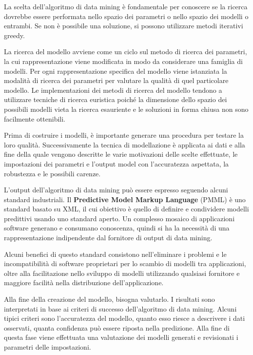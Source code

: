 \documentclass[a4paper]{extarticle}
\begin{document}
La scelta dell'algoritmo di data mining è fondamentale per conoscere se la ricerca dovrebbe essere performata nello spazio dei parametri o nello spazio dei modelli o entrambi. Se non è possibile una soluzione, si possono utilizzare metodi iterativi greedy. 

La ricerca del modello avviene come un ciclo sul metodo di ricerca dei parametri, la cui rappresentazione viene modificata in modo da considerare una famiglia di modelli. Per ogni rappresentazione specifica del modello viene istanziata la modalità di ricerca dei parametri per valutare la qualità di quel particolare modello. Le implementazioni dei metodi di ricerca del modello tendono a utilizzare tecniche di ricerca euristica poiché la dimensione dello spazio dei possibili modelli vieta la ricerca esauriente e le soluzioni in forma chiusa non sono facilmente ottenibili.

Prima di costruire i modelli, è importante generare una procedura per testare la loro qualità. Successivamente la tecnica di modellazione è applicata ai dati e alla fine della quale vengono descritte le varie motivazioni delle scelte effettuate, le impostazioni dei parametri e l'output model con l'accuratezza aspettata, la robustezza e le possibili carenze.

L'output dell'algoritmo di data mining può essere espresso seguendo alcuni standard industriali. Il \textbf{Predictive Model Markup Language} (PMML) è uno standard basato su XML, il cui obiettivo è quello di definire e condividere modelli predittivi usando uno standard aperto. Un complesso mosaico di applicazioni software generano e consumano conoscenza, quindi si ha la necessità di una rappresentazione indipendente dal fornitore di output di data mining. 

Alcuni benefici di questo standard consistono nell'eliminare i problemi e le incompatibilità di software proprietari per lo scambio di modelli tra applicazioni,  oltre alla facilitazione nello sviluppo di modelli utilizzando qualsiasi fornitore e maggiore facilità nella  distribuzione dell'applicazione.

Alla fine della creazione del modello, bisogna valutarlo. I risultati sono interpretati in base ai criteri di successo dell'algoritmo di data mining. Alcuni tipici criteri sono l'accuratezza del modello, quanto esso riesce a descrivere i dati osservati, quanta confidenza può essere riposta nella predizione. Alla fine di questa fase viene effettuata una valutazione dei modelli generati e revisionati i parametri delle impostazioni. 
\end{document}
